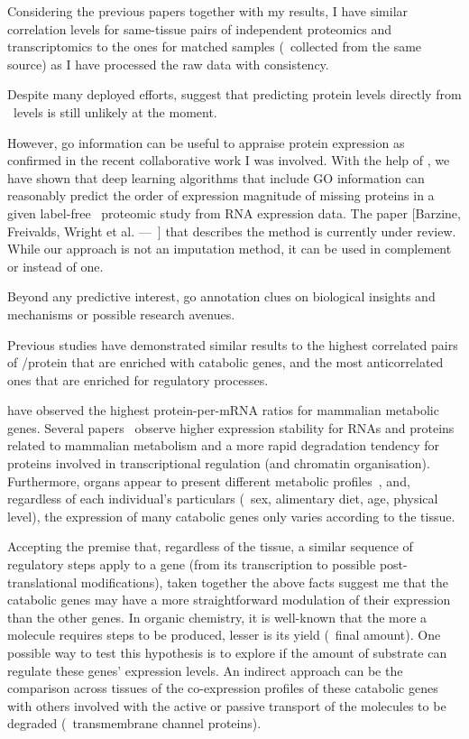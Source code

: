 Considering the previous papers together with my results,
I have similar correlation levels for same-tissue pairs of
independent proteomics and transcriptomics
to the ones for matched samples (\ie\ collected from the same source)
as I have processed the raw data with consistency.\mybr\

Despite many deployed efforts,
\citet{Franks2017-bp,Eraslan2019-md} suggest that
predicting protein levels directly from \mRNA\ levels
is still unlikely at the moment.\mybr\

However, \gls{go} information can be useful to appraise protein expression
as confirmed in the recent collaborative work I was involved.
With the help of \karlis,
we have shown that deep learning algorithms that include GO information
can reasonably predict the order of expression magnitude of missing proteins
in a given label-free \ms\ proteomic study from \gls{RNA} expression data.
The paper $\lbrack$Barzine,
Freivalds, Wright et al. ---~\cite{deepLearning2020}$\rbrack$
that describes the method is currently under review.
While our approach is not an imputation method,
it can be used in complement or instead of one.\mybr\

Beyond any predictive interest,
\gls{go} annotation clues on biological insights and mechanisms
or possible research avenues.\mybr\

Previous studies have demonstrated similar results to
the highest correlated pairs of \mRNA/protein
that are enriched with catabolic genes,
and the most anticorrelated ones that are enriched for regulatory processes.\mybr\

\citet{Vogel2010-ux} have observed the highest protein-per-mRNA ratios
for mammalian metabolic genes.
Several papers~
observe higher expression stability for
\glspl{RNA} and proteins related to mammalian metabolism
and a more rapid degradation tendency
for proteins involved in transcriptional regulation (and chromatin organisation).
Furthermore, organs appear to present
different metabolic profiles~,
and, regardless of each individual's particulars
(\eg\ sex, alimentary diet, age, physical level),
the expression of many catabolic genes only varies according to the tissue.\mybr\

Accepting the premise that,
regardless of the tissue,
a similar sequence of regulatory steps apply to a gene
(from its transcription to possible post-translational modifications),
taken together the above facts suggest me that
the catabolic genes may have
a more straightforward modulation of their expression than the other genes.
In organic chemistry,
it is well-known that the more a molecule requires steps to be produced,
lesser is its yield (\ie\ final amount).
One possible way to test this hypothesis is to explore if
the amount of substrate can regulate these genes' expression levels.
An indirect approach can be
the comparison across tissues of the co-expression profiles of these catabolic genes
with others involved with the active or passive transport of the molecules
to be degraded (\eg\ transmembrane channel proteins).\mybr\

